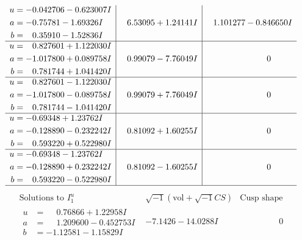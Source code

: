 \documentclass[1p]{elsarticle_modified}
\theoremstyle{definition}
\newcommand{\I}{\sqrt{-1}}
\begin{document}
$$\begin{array}{c|c|c}
\begin{aligned}
u &= -0.042706 - 0.623007 I \\
a &= -0.75781 - 1.69326 I \\
b &= \phantom{-}0.35910 - 1.52836 I\end{aligned}
 & \phantom{-}6.53095 + 1.24141 I & \phantom{-}1.101277 - 0.846650 I \\ \hline\begin{aligned}
u &= \phantom{-}0.827601 + 1.122030 I \\
a &= -1.017800 + 0.089758 I \\
b &= \phantom{-}0.781744 + 1.041420 I\end{aligned}
 & \phantom{-}0.99079 - 7.76049 I & \phantom{-0.000000 } 0 \\ \hline\begin{aligned}
u &= \phantom{-}0.827601 - 1.122030 I \\
a &= -1.017800 - 0.089758 I \\
b &= \phantom{-}0.781744 - 1.041420 I\end{aligned}
 & \phantom{-}0.99079 + 7.76049 I & \phantom{-0.000000 } 0 \\ \hline\begin{aligned}
u &= -0.69348 + 1.23762 I \\
a &= -0.128890 - 0.232242 I \\
b &= \phantom{-}0.593220 + 0.522980 I\end{aligned}
 & \phantom{-}0.81092 + 1.60255 I & \phantom{-0.000000 } 0 \\ \hline\begin{aligned}
u &= -0.69348 - 1.23762 I \\
a &= -0.128890 + 0.232242 I \\
b &= \phantom{-}0.593220 - 0.522980 I\end{aligned}
 & \phantom{-}0.81092 - 1.60255 I & \phantom{-0.000000 } 0\\
 \hline 
 \end{array}$$\newpage$$\begin{array}{c|c|c}  
\text{Solutions to }I^u_{1}& \I (\text{vol} + \sqrt{-1}CS) & \text{Cusp shape}\\
 \hline 
\begin{aligned}
u &= \phantom{-}0.76866 + 1.22958 I \\
a &= \phantom{-}1.209600 - 0.452753 I \\
b &= -1.12581 - 1.15829 I\end{aligned}
 & -7.1426 - 14.0288 I & \phantom{-0.000000 } 0 \\ \hline\begin{aligned}

\end{aligned}
\end{array}$$
\end{document}
